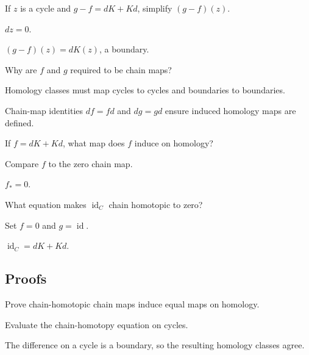 \begin{exercise}\label{exr:viii22-ped-02}
If $z$ is a cycle and $g-f=dK+Kd$, simplify $(g-f)(z)$.
\end{exercise}
\begin{hint}
$dz=0$.
\end{hint}
\begin{solution}
$(g-f)(z)=dK(z)$, a boundary.
\end{solution}

\begin{exercise}\label{exr:viii22-ped-03}
Why are $f$ and $g$ required to be chain maps?
\end{exercise}
\begin{hint}
Homology classes must map cycles to cycles and boundaries to boundaries.
\end{hint}
\begin{solution}
Chain-map identities $df=fd$ and $dg=gd$ ensure induced homology maps are defined.
\end{solution}

\begin{exercise}\label{exr:viii22-ped-04}
If $f=dK+Kd$, what map does $f$ induce on homology?
\end{exercise}
\begin{hint}
Compare $f$ to the zero chain map.
\end{hint}
\begin{solution}
$f_*=0$.
\end{solution}

\begin{exercise}\label{exr:viii22-ped-05}
What equation makes $\operatorname{id}_C$ chain homotopic to zero?
\end{exercise}
\begin{hint}
Set $f=0$ and $g=\operatorname{id}$.
\end{hint}
\begin{solution}
$\operatorname{id}_C=dK+Kd$.
\end{solution}

\subsection*{Proofs}

\begin{exercise}\label{exr:viii22-ped-06}
Prove chain-homotopic chain maps induce equal maps on homology.
\end{exercise}
\begin{hint}
Evaluate the chain-homotopy equation on cycles.
\end{hint}
\begin{solution}
The difference on a cycle is a boundary, so the resulting homology classes agree.
\end{solution}

